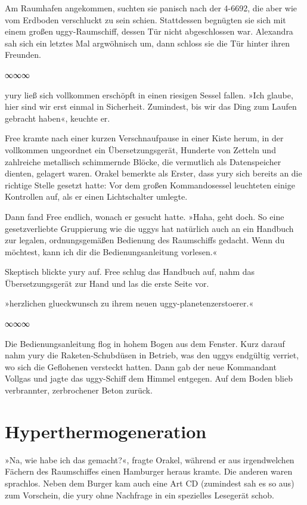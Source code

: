 Am Raumhafen angekommen, suchten sie panisch nach der 4-6692, die aber wie vom Erdboden verschluckt zu sein schien. Stattdessen begnügten sie sich mit einem großen uggy-Raumschiff, dessen Tür nicht abgeschlossen war. Alexandra sah sich ein letztes Mal argwöhnisch um, dann schloss sie die Tür hinter ihren Freunden.

\begin{center}
    ∞∞∞
\end{center}

yury ließ sich vollkommen erschöpft in einen riesigen Sessel fallen. »Ich glaube, hier sind wir erst einmal in Sicherheit. Zumindest, bis wir das Ding zum Laufen gebracht haben«, keuchte er.

Free kramte nach einer kurzen Verschnaufpause in einer Kiste herum, in der vollkommen ungeordnet ein Übersetzungsgerät, Hunderte von Zetteln und zahlreiche metallisch schimmernde Blöcke, die vermutlich als Datenspeicher dienten, gelagert waren. Orakel bemerkte als Erster, dass yury sich bereits an die richtige Stelle gesetzt hatte: Vor dem großen Kommandosessel leuchteten einige Kontrollen auf, als er einen Lichtschalter umlegte.

Dann fand Free endlich, wonach er gesucht hatte. »Haha, geht doch. So eine gesetzverliebte Gruppierung wie die uggys hat natürlich auch an ein Handbuch zur legalen, ordnungsgemäßen Bedienung des Raumschiffs gedacht. Wenn du möchtest, kann ich dir die Bedienungsanleitung vorlesen.«

Skeptisch blickte yury auf. Free schlug das Handbuch auf, nahm das Übersetzungsgerät zur Hand und las die erste Seite vor.

»herzlichen glueckwunsch zu ihrem neuen uggy-planetenzerstoerer.«

\begin{center}
    ∞∞∞
\end{center}

Die Bedienungsanleitung flog in hohem Bogen aus dem Fenster. Kurz darauf nahm yury die Raketen-Schubdüsen in Betrieb, was den uggys endgültig verriet, wo sich die Geflohenen versteckt hatten. Dann gab der neue Kommandant Vollgas und jagte das uggy-Schiff dem Himmel entgegen. Auf dem Boden blieb verbrannter, zerbrochener Beton zurück.


\chapter{Hyperthermogeneration}

»Na, wie habe ich das gemacht?«, fragte Orakel, während er aus irgendwelchen Fächern des Raumschiffes einen Hamburger heraus kramte. Die anderen waren sprachlos. Neben dem Burger kam auch eine Art CD (zumindest sah es so aus) zum Vorschein, die yury ohne Nachfrage in ein spezielles Lesegerät schob.

